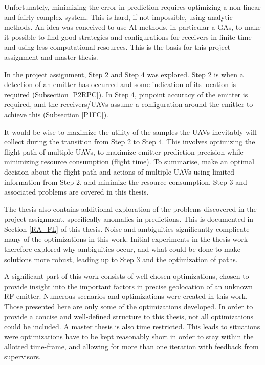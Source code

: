 \documentclass[10pt,a4paper]{book}
\begin{document}
Unfortunately, minimizing the error in prediction requires optimizing a non-linear and fairly complex system. This is hard, if not impossible, using analytic methods. An idea was conceived to use \gls{AI} methods, in particular a \glspl{GA}, to make it possible to find good strategies and configurations for receivers in finite time and using less computational resources. This is the basis for this project assignment and master thesis.

In the project assignment, Step 2 and Step 4 was explored. Step 2 is when a detection of an emitter has occurred and some indication of its location is required (Subsection \ref{P2RPC}). In Step 4, pinpoint accuracy of the emitter is required, and the receivers/\glspl{UAV} assume a configuration around the emitter to achieve this (Subsection \ref{P1FC}). 


\newpage
It would be wise to maximize the utility of the samples the \glspl{UAV} inevitably will collect during the transition from Step 2 to Step 4. This involves optimizing the flight path of multiple \glspl{UAV}, to maximize emitter prediction precision while minimizing resource consumption (flight time). To summarise, make an optimal decision about the flight path and actions of multiple \glspl{UAV} using limited information from Step 2, and minimize the resource consumption. Step 3 and associated problems are covered in this thesis.

The thesis also contains additional exploration of the problems discovered in the project assignment, specifically anomalies in predictions. This is documented in Section \ref{RA_FL} of this thesis. Noise and ambiguities significantly complicate many of the optimizations in this work. Initial experiments in the thesis work therefore explored why ambiguities occur, and what could be done to make solutions more robust, leading up to Step 3 and the optimization of paths.

A significant part of this work consists of well-chosen optimizations, chosen to provide insight into the important factors in precise geolocation of an unknown \gls{RF} emitter. Numerous scenarios and optimizations were created in this work. Those presented here are only some of the optimizations developed. In order to provide a concise and well-defined structure to this thesis, not all optimizations could be included. A master thesis is also time restricted. This leads to situations were optimizations have to be kept reasonably short in order to stay within the allotted time-frame, and allowing for more than one iteration with feedback from supervisors.
\end{document}

